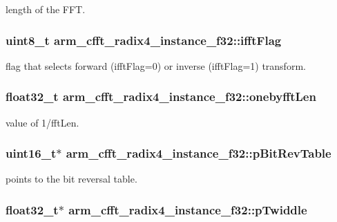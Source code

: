 length of the F\-F\-T. \hypertarget{structarm__cfft__radix4__instance__f32_a25d1da64dd6487c291f04d226f9acc66}{
\subsubsection[{ifft\-Flag}]{\setlength{\rightskip}{0pt plus 5cm}uint8\-\_\-t arm\-\_\-cfft\-\_\-radix4\-\_\-instance\-\_\-f32\-::ifft\-Flag}}\label{structarm__cfft__radix4__instance__f32_a25d1da64dd6487c291f04d226f9acc66}
flag that selects forward (ifft\-Flag=0) or inverse (ifft\-Flag=1) transform. \hypertarget{structarm__cfft__radix4__instance__f32_ab9eed39e40b8d7c16381fbccf84467cd}{
\subsubsection[{onebyfft\-Len}]{\setlength{\rightskip}{0pt plus 5cm}float32\-\_\-t arm\-\_\-cfft\-\_\-radix4\-\_\-instance\-\_\-f32\-::onebyfft\-Len}}\label{structarm__cfft__radix4__instance__f32_ab9eed39e40b8d7c16381fbccf84467cd}
value of 1/fft\-Len. \hypertarget{structarm__cfft__radix4__instance__f32_a8da0d2ca69749fde8cbb95caeac6fe6a}{
\subsubsection[{p\-Bit\-Rev\-Table}]{\setlength{\rightskip}{0pt plus 5cm}uint16\-\_\-t$\ast$ arm\-\_\-cfft\-\_\-radix4\-\_\-instance\-\_\-f32\-::p\-Bit\-Rev\-Table}}\label{structarm__cfft__radix4__instance__f32_a8da0d2ca69749fde8cbb95caeac6fe6a}
points to the bit reversal table. \hypertarget{structarm__cfft__radix4__instance__f32_a14860c7544911702ca1fa0bf78204ef3}{
\subsubsection[{p\-Twiddle}]{\setlength{\rightskip}{0pt plus 5cm}float32\-\_\-t$\ast$ arm\-\_\-cfft\-\_\-radix4\-\_\-instance\-\_\-f32\-::p\-Twiddle}}\label{structarm__cfft__radix4__instance__f32_a14860c7544911702ca1fa0bf78204ef3}
